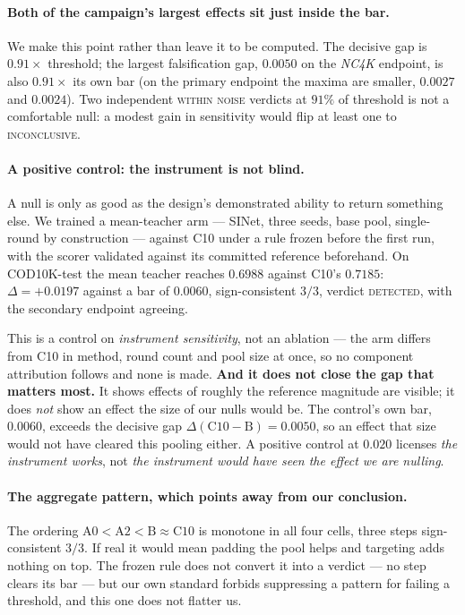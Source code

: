 \documentclass{article} %
\begin{document}
\paragraph{Both of the campaign's largest effects sit just inside the bar.} We make this point rather
than leave it to be computed. The decisive gap is $0.91\times$ threshold; the largest falsification
gap, $0.0050$ on the \emph{NC4K} endpoint, is also $0.91\times$ its own bar (on the primary endpoint
the maxima are smaller, $0.0027$ and $0.0024$). Two independent \textsc{within noise} verdicts at
$91\%$ of threshold is not a comfortable null: a modest gain in sensitivity would flip at least one to
\textsc{inconclusive}.

\paragraph{A positive control: the instrument is not blind.} A null is only as good as the design's
demonstrated ability to return something else. We trained a mean-teacher arm --- SINet, three seeds,
base pool, single-round by construction --- against C10 under a rule frozen before the first run, with
the scorer validated against its committed reference beforehand. On COD10K-test the mean teacher
reaches $0.6988$ against C10's $0.7185$: $\Delta = +0.0197$ against a bar of $0.0060$, sign-consistent
$3/3$, verdict \textsc{detected}, with the secondary endpoint agreeing.

This is a control on \emph{instrument sensitivity}, not an ablation --- the arm differs from C10 in
method, round count and pool size at once, so no component attribution follows and none is made.
\textbf{And it does not close the gap that matters most.} It shows effects of roughly the reference
magnitude are visible; it does \emph{not} show an effect the size of our nulls would be. The control's
own bar, $0.0060$, exceeds the decisive gap $\Delta(\mathrm{C10}-\mathrm{B}) = 0.0050$, so an effect
that size would not have cleared this pooling either. A positive control at $0.020$ licenses \emph{the
instrument works}, not \emph{the instrument would have seen the effect we are nulling}.

\paragraph{The aggregate pattern, which points away from our conclusion.} The ordering
$\mathrm{A0}<\mathrm{A2}<\mathrm{B}\approx\mathrm{C10}$ is monotone in all four cells, three steps
sign-consistent $3/3$. If real it would mean padding the pool helps and targeting adds nothing on top.
The frozen rule does not convert it into a verdict --- no step clears its bar --- but our own standard
forbids suppressing a pattern for failing a threshold, and this one does not flatter us.
\end{document}
